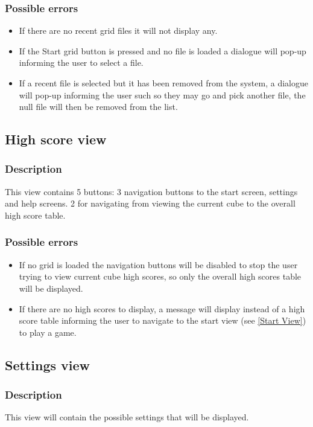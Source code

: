 \documentclass{project}
\begin{document}
\subsubsection{Possible errors}
\begin{itemize}
\item If there are no recent grid files it will not display any.
\item If the Start grid button is pressed and no file is loaded a dialogue will pop-up informing the user to select a file.
\item If a recent file is selected but it has been removed from the system, a dialogue will pop-up informing the user such so they may go and pick another file, the null file will then be removed from the list.
\end{itemize}

\subsection{High score view} \label{High score View}
\subsubsection{Description}
This view contains 5 buttons: 3 navigation buttons to the start screen, settings and help screens. 2 for navigating from viewing the current cube to the overall high score table.
\subsubsection{Possible errors}
\begin{itemize}
\item If no grid is loaded the navigation buttons will be disabled to stop the user trying to view current cube high scores, so only the overall high scores table will be displayed.
\item If there are no high scores to display, a message will display instead of a high score table informing the user to navigate to the start view (see \ref{Start View}) to play a game.
\end{itemize}

\subsection{Settings view} \label{Settings View}
\subsubsection{Description}
This view will contain the possible settings that will be displayed.
\end{document}
